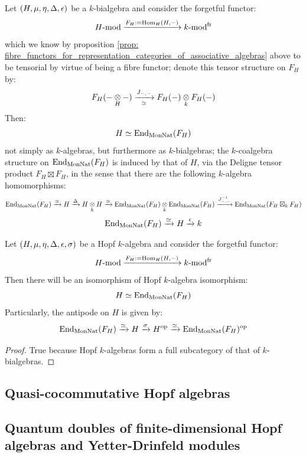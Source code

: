         \begin{proposition} \label{prop: fibre_functors_for_representation_categories_of_bialgebras}
            Let $(H, \mu, \eta, \Delta, \epsilon)$ be a $k$-bialgebra and consider the forgetful functor:
                $$H\text{-}\mathrm{mod} \xrightarrow[]{F_H := \operatorname{Hom}_H(H, -)} k\text{-}\mathrm{mod}^{\mathrm{fr}}$$
            which we know by proposition \ref{prop: fibre_functors_for_representation_categories_of_associative_algebras} above to be tensorial by virtue of being a fibre functor; denote this tensor structure on $F_H$ by:
                $$F_H(- \tensor_H -) \xrightarrow[\cong]{J_{-, -}} F_H(-) \tensor_k F_H(-)$$
            Then:
                $$H \simeq \operatorname{End}_{\mathrm{Mon}\mathrm{Nat}}(F_H)$$
            not simply as $k$-algebras, but furthermore as $k$-bialgebras; the $k$-coalgebra structure on $\operatorname{End}_{\mathrm{Mon}\mathrm{Nat}}(F_H)$ is induced by that of $H$, via the Deligne tensor product $F_H \boxtimes F_H$, in the sense that there are the following $k$-algebra homomorphisms:
                $$\End_{\Mon\Nat}(F_H) \xrightarrow[]{\cong} H \xrightarrow[]{\Delta} H \tensor_k H \xrightarrow[]{\cong} \End_{\Mon\Nat}(F_H) \tensor_k \End_{\Mon\Nat}(F_H) \xrightarrow[]{J_{-, -}^{-1}} \End_{\Mon\Nat}(F_H \boxtimes_k F_H)$$
                $$\operatorname{End}_{\mathrm{Mon}\mathrm{Nat}}(F_H) \xrightarrow[]{\simeq} H \xrightarrow[]{\epsilon} k$$
        \end{proposition}
        \begin{corollary} \label{coro: fibre_functors_for_representation_categories_of_hopf_algebras}
            Let $(H, \mu, \eta, \Delta, \epsilon, \sigma)$ be a Hopf $k$-algebra and consider the forgetful functor:
                $$H\text{-}\mathrm{mod} \xrightarrow[]{F_H := \operatorname{Hom}_H(H, -)} k\text{-}\mathrm{mod}^{\mathrm{fr}}$$
            Then there will be an isomorphism of Hopf $k$-algebra isomorphism:
                $$H \simeq \operatorname{End}_{\mathrm{Mon}\mathrm{Nat}}(F_H)$$
            Particularly, the antipode on $H$ is given by:
                $$\operatorname{End}_{\mathrm{Mon}\mathrm{Nat}}(F_H) \xrightarrow[]{\simeq} H \xrightarrow[]{\sigma} H^{\mathrm{op}} \xrightarrow[]{\simeq} \operatorname{End}_{\mathrm{Mon}\mathrm{Nat}}(F_H)^{\mathrm{op}}$$
        \end{corollary}
            \begin{proof}
                True because Hopf $k$-algebras form a full subcategory of that of $k$-bialgebras. 
            \end{proof}
    
    \subsection{Quasi-cocommutative Hopf algebras}
    
    \subsection{Quantum doubles of finite-dimensional Hopf algebras and Yetter-Drinfeld modules}